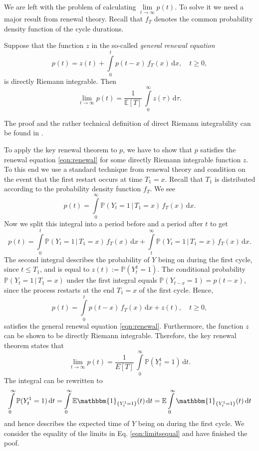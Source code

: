 \documentclass[smallextended]{svjour3}
\renewcommand{\P}{\mathbb{P}}
\newcommand{\E}{\mathbb{E}}
\newcommand{\intl}{\int\limits}
\newcommand{\liml}{\lim\limits}
\begin{document}
We are left with the problem of calculating $\liml_{t\to\infty}p(t)$.
To solve it we need a major result from renewal theory.
Recall that $f_T$ denotes the common probability density function of the cycle durations.

\begin{theorem}
Suppose that the function $z$ in the so-called \emph{general renewal equation}
\begin{equation}\label{eqn:renewal}
    p(t) = z(t) + \intl_0^t p(t-x)\,f_T(x)\,\mathrm{d}x,\quad t\geq0,
\end{equation}
is directly Riemann integrable. Then
\[
    \liml_{t\to\infty} p(t) = \frac{1}{\E[T]}\,\intl_0^\infty z(\tau)\,\mathrm{d}\tau.
\]
\end{theorem}

The proof and the rather technical definition of direct Riemann integrability can be found in \citet[Sect. V.4]{Asmussen2003}.

To apply the key renewal theorem to $p$, we have to show that $p$ satisfies the renewal equation \eqref{eqn:renewal} for some directly Riemann integrable function $z$.
To this end we use a standard technique from renewal theory and condition on the event that the first restart occurs at time $T_1=x$.
Recall that $T_1$ is distributed according to the probability density function $f_T$.
We see
\[
    p(t) = \intl_0^\infty\P(Y_t=1\,|\,T_1=x)\,f_T(x)\,\mathrm{d}x.
\]
Now we split this integral into a period before and a period after $t$ to get
\[
    p(t)=\intl_0^t\P(Y_t=1\,|\,T_1=x)\,f_T(x)\,\mathrm{d}x + \intl_t^\infty\P(Y_t=1\,|\,T_1=x)\,f_T(x)\,\mathrm{d}x.
\]
The second integral describes the probability of $Y$ being on during the first cycle, since $t\leq T_1$, and is equal to $z(t):=\P(Y^1_t=1)$.
The conditional probability $\P(Y_t=1\,|\,T_1=x)$ under the first integral equals $\P(Y_{t-x}=1)=p(t-x)$, since the process restarts at the end $T_1=x$ of the first cycle.
Hence,
\[
    p(t) = \intl_0^t p(t-x)\,f_T(x)\,\mathrm{d}x + z(t),\quad t\geq0,
\]
satisfies the general renewal equation \eqref{eqn:renewal}.
Furthermore, the function $z$ can be shown to be directly Riemann integrable.
Therefore, the key renewal theorem states that
\begin{equation}\label{eqn:probY}
    \liml_{t\to\infty}p(t) = \frac{1}{E[T]}\,\intl_0^\infty \P(Y^1_t=1)\,\mathrm{d}t.
\end{equation}
The integral can be rewritten to
\[
    \intl_0^\infty\P(Y_t^1=1)\,\mathrm{d}t = \intl_0^\infty\E\mathbbm{1}_{\{Y_t^1=1\}}(t)\,\mathrm{d}t = \E\intl_0^\infty\mathbbm{1}_{\{Y_t^1=1\}}(t)\,\mathrm{d}t
\]
and hence describes the expected time of $Y$ being on during the first cycle. We consider the equality of the limits in Eq. \eqref{eqn:limitsequal} and have finished the poof.
\end{document}
